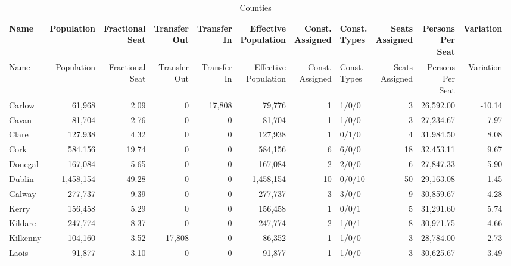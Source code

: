 \documentclass[a4paper]{article}
\begin{document}
\begin{longtable}{lrrrrrrlrrr}
\caption{Counties}
\\ \toprule
Name &Population &\shortstack{Fractional\\Seat} &\shortstack{Transfer\\Out} &\shortstack{Transfer\\In} &\shortstack{Effective\\Population} &\shortstack{Const.\\Assigned} &\shortstack{Const.\\Types} &\shortstack{Seats\\Assigned} &\shortstack{Persons\\Per\\Seat} &Variation \\ \midrule
\endfirsthead
\toprule
Name &Population &\shortstack{Fractional\\Seat} &\shortstack{Transfer\\Out} &\shortstack{Transfer\\In} &\shortstack{Effective\\Population} &\shortstack{Const.\\Assigned} &\shortstack{Const.\\Types} &\shortstack{Seats\\Assigned} &\shortstack{Persons\\Per\\Seat} &Variation \\ \midrule
\endhead
\bottomrule
\endfoot
Carlow&61,968& 2.09&0&17,808&79,776&1&1/0/0&3&26,592.00&-10.14\\ 
Cavan&81,704& 2.76&0&0&81,704&1&1/0/0&3&27,234.67&-7.97\\ 
Clare&127,938& 4.32&0&0&127,938&1&0/1/0&4&31,984.50& 8.08\\ 
Cork&584,156&19.74&0&0&584,156&6&6/0/0&18&32,453.11& 9.67\\ 
Donegal&167,084& 5.65&0&0&167,084&2&2/0/0&6&27,847.33&-5.90\\ 
Dublin&1,458,154&49.28&0&0&1,458,154&10&0/0/10&50&29,163.08&-1.45\\ 
Galway&277,737& 9.39&0&0&277,737&3&3/0/0&9&30,859.67& 4.28\\ 
Kerry&156,458& 5.29&0&0&156,458&1&0/0/1&5&31,291.60& 5.74\\ 
Kildare&247,774& 8.37&0&0&247,774&2&1/0/1&8&30,971.75& 4.66\\ 
Kilkenny&104,160& 3.52&17,808&0&86,352&1&1/0/0&3&28,784.00&-2.73\\ 
Laois&91,877& 3.10&0&0&91,877&1&1/0/0&3&30,625.67& 3.49\\ 

\end{longtable}
\end{document}
